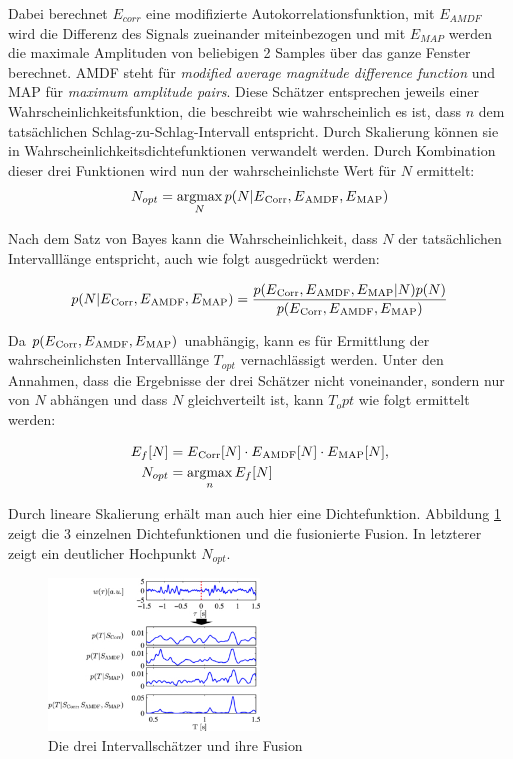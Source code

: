  	Dabei berechnet $E_{corr}$ eine modifizierte Autokorrelationsfunktion, mit $E_{AMDF}$ wird die Differenz des Signals zueinander miteinbezogen und mit $E_{MAP}$ werden die maximale Amplituden von beliebigen 2 Samples über das ganze Fenster berechnet. AMDF steht für \textit{modified average magnitude difference function} und MAP für \textit{maximum amplitude pairs}. Diese Schätzer entsprechen jeweils einer Wahrscheinlichkeitsfunktion, die beschreibt wie wahrscheinlich es ist, dass $n$ dem tatsächlichen Schlag-zu-Schlag-Intervall entspricht. Durch Skalierung können sie in Wahrscheinlichkeitsdichtefunktionen verwandelt werden. Durch Kombination dieser drei Funktionen wird nun der wahrscheinlichste Wert für $N$ ermittelt:
 	\[ N_{opt} = \operatorname*{argmax}_{N} p(N|E\textsubscript{Corr}, E\textsubscript{AMDF}, E\textsubscript{MAP}) \]
 	
	Nach dem Satz von Bayes kann die Wahrscheinlichkeit, dass $N$ der tatsächlichen Intervalllänge entspricht, auch wie folgt ausgedrückt werden:
	
	\[
		p(N|E\textsubscript{Corr}, E\textsubscript{AMDF}, E\textsubscript{MAP}) = \frac{p(E\textsubscript{Corr}, E\textsubscript{AMDF}, E\textsubscript{MAP} | N) p(N)}{p(E\textsubscript{Corr}, E\textsubscript{AMDF}, E\textsubscript{MAP})}
	\]
	
	Da $p(E\textsubscript{Corr}, E\textsubscript{AMDF}, E\textsubscript{MAP})$ unabhängig, kann es für Ermittlung der wahrscheinlichsten Intervalllänge $T_{opt}$ vernachlässigt werden. Unter den Annahmen, dass die Ergebnisse der drei Schätzer nicht voneinander, sondern nur von $N$ abhängen und dass $N$ gleichverteilt ist, kann $T_opt$ wie folgt ermittelt werden:
	
	\begin{align*}
		E_f[N] &= E\textsubscript{Corr}[N] \cdot E\textsubscript{AMDF}[N] \cdot E\textsubscript{MAP}[N],\\
		N_{opt} &= \operatorname*{argmax}_{n} E_f[N]	
	\end{align*}
	
	Durch lineare Skalierung erhält man auch hier eine Dichtefunktion. Abbildung \ref{fig:estimator-fusion} zeigt die 3 einzelnen Dichtefunktionen und die fusionierte Fusion. In letzterer zeigt ein deutlicher Hochpunkt $N_{opt}$.
	
	 \begin{figure}[H]
		\centering
		\includegraphics[width=0.5\textwidth]{pic/estimator-fusion.png}
		\caption[Intervallschätzer nach \citeauthor{Bruser2013}]{Die drei Intervallschätzer und ihre Fusion}
		\label{fig:estimator-fusion}
	\end{figure}
	
